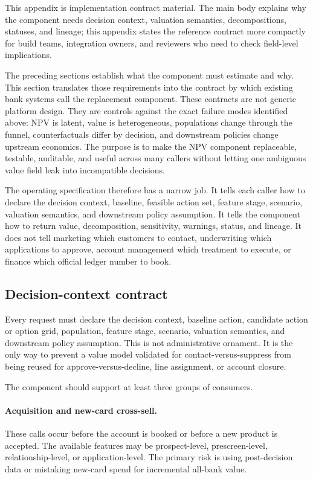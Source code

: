 \documentclass[11pt]{article}
\newcommand{\1}{\mathbf{1}}
\begin{document}
This appendix is implementation contract material. The main body explains why
the component needs decision context, valuation semantics, decompositions,
statuses, and lineage; this appendix states the reference contract more
compactly for build teams, integration owners, and reviewers who need to check
field-level implications.

The preceding sections establish what the component must estimate and why.
This section translates those requirements into the contract by which existing
bank systems call the replacement component. These contracts are not generic
platform design. They are controls against the exact failure modes identified
above: NPV is latent, value is heterogeneous, populations change through the
funnel, counterfactuals differ by decision, and downstream policies change
upstream economics. The purpose is to make the NPV component replaceable,
testable, auditable, and useful across many callers without letting one
ambiguous value field leak into incompatible decisions.

The operating specification therefore has a narrow job. It tells each caller
how to declare the decision context, baseline, feasible action set, feature
stage, scenario, valuation semantics, and downstream policy assumption. It
tells the component how to return value, decomposition, sensitivity, warnings,
status, and lineage. It does not tell marketing which customers to contact,
underwriting which applications to approve, account management which treatment
to execute, or finance which official ledger number to book.

\subsection{Decision-context contract}
\label{subsec:decision-context-contract}

Every request must declare the decision context, baseline action, candidate
action or option grid, population, feature stage, scenario, valuation semantics,
and downstream policy assumption. This is not administrative ornament. It is
the only way to prevent a value model validated for contact-versus-suppress
from being reused for approve-versus-decline, line assignment, or account
closure.

The component should support at least three groups of consumers.

\paragraph{Acquisition and new-card cross-sell.}
These calls occur before the account is booked or before a new product is
accepted. The available features may be prospect-level, prescreen-level,
relationship-level, or application-level. The primary risk is using
post-decision data or mistaking new-card spend for incremental all-bank value.
\end{document}
